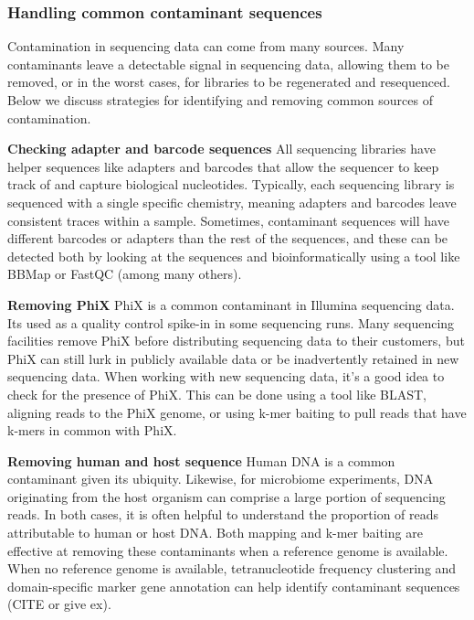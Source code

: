 \documentclass[10pt,letterpaper]{article}
\begin{document}
\subsubsection*{Handling common contaminant sequences}
Contamination in sequencing data can come from many sources. 
Many contaminants leave a detectable signal in sequencing data, allowing them to be removed, or in the worst cases, for libraries to be regenerated and resequenced. 
Below we discuss strategies for identifying and removing common sources of contamination.

\textbf{Checking adapter and barcode sequences}
All sequencing libraries have helper sequences like adapters and barcodes that allow the sequencer to keep track of and capture biological nucleotides. 
Typically, each sequencing library is sequenced with a single specific chemistry, meaning adapters and barcodes leave consistent traces within a sample. 
Sometimes, contaminant sequences will have different barcodes or adapters than the rest of the sequences, and these can be detected both by looking at the sequences and bioinformatically using a tool like BBMap or FastQC (among many others). 

\textbf{Removing PhiX}
PhiX is a common contaminant in Illumina sequencing data. Its used as a quality control spike-in in some sequencing runs. 
Many sequencing facilities remove PhiX before distributing sequencing data to their customers, but PhiX can still lurk in publicly available data or be inadvertently retained in new sequencing data. 
When working with new sequencing data, it’s a good idea to check for the presence of PhiX. 
This can be done using a tool like BLAST, aligning reads to the PhiX genome, or using k-mer baiting to pull reads that have k-mers in common with PhiX. 

\textbf{Removing human and host sequence}
Human DNA is a common contaminant given its ubiquity. 
Likewise, for microbiome experiments, DNA originating from the host organism can comprise a large portion of sequencing reads.
In both cases, it is often helpful to understand the proportion of reads attributable to human or host DNA. 
Both mapping and k-mer baiting are effective at removing these contaminants when a reference genome is available. 
When no reference genome is available, tetranucleotide frequency clustering and domain-specific marker gene annotation can help identify contaminant sequences (CITE or give ex).
\end{document}

